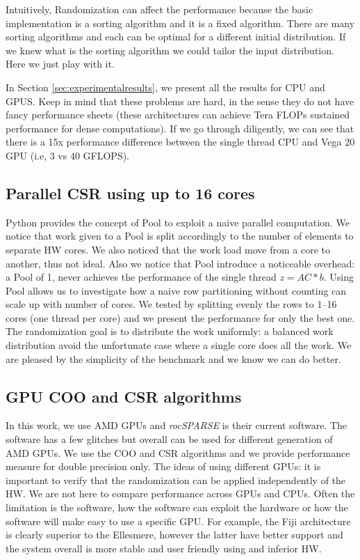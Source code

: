 \documentclass[manuscript,screen]{acmart}
\begin{document}
Intuitively, Randomization can affect the performance because the
basic implementation is a sorting algorithm and it is a fixed
algorithm. There are many sorting algorithms and each can be optimal
for a different initial distribution. If we knew what is the sorting
algorithm we could tailor the input distribution. Here we just play
with it.

In Section \ref{sec:experimentalresults}, we present all the results
for CPU and GPUS. Keep in mind that these problems are hard, in the
sense they do not have fancy performance sheets (these architectures
can achieve Tera FLOPs sustained performance for dense computations).
If we go through diligently, we can see that there is a 15x
performance difference between the single thread CPU and Vega 20 GPU
(i.e, 3 vs 40 GFLOPS).

\subsection{Parallel CSR using up to 16 cores}
\label{sec:parcpu}
Python provides the concept of Pool to exploit a naive parallel
computation. We notice that work given to a Pool is split accordingly
to the number of elements to separate HW cores. We also noticed that
the work load move from a core to another, thus not ideal. Also we
notice that Pool introduce a noticeable overhead: a Pool of 1, never
achieves the performance of the single thread $z = AC*b$. Using Pool
allows us to investigate how a naive row partitioning without counting
can scale up with number of cores. We tested by splitting evenly the
rows to 1--16 cores (one thread per core) and we present the
performance for only the best one. The randomization goal is to
distribute the work uniformly: a balanced work distribution avoid the
unfortunate case where a single core does all the work. We are pleased
by the simplicity of the benchmark and we know we can do better. 



\subsection{GPU COO and CSR algorithms}
\label{sec:gpucoocsr}
In this work, we use AMD GPUs and {\em rocSPARSE} is their current
software. The software has a few glitches but overall can be used for
different generation of AMD GPUs. We use the COO and CSR algorithms
and we provide performance measure for double precision only. The
ideas of using different GPUs: it is important to verify that the
randomization can be applied independently of the HW. We are not here
to compare performance across GPUs and CPUs. Often the limitation is
the software, how the software can exploit the hardware or how the
software will make easy to use a specific GPU. For example, the Fiji
architecture is clearly superior to the Ellesmere, however the latter
have better support and the system overall is more stable and user
friendly using and inferior HW.
\end{document}
